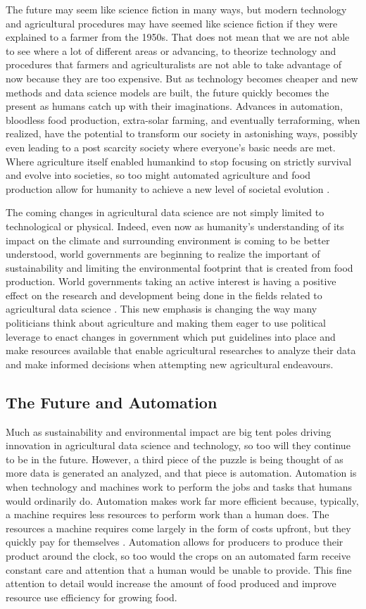 \documentclass[sigconf]{acmart}
\begin{document}
The future may seem like science fiction in many ways, but modern technology and agricultural procedures may have seemed like science fiction if they were explained to a farmer from the 1950s. That does not mean that we are not able to see where a lot of different areas or advancing, to theorize technology and procedures that farmers and agriculturalists are not able to take advantage of now because they are too expensive. But as technology becomes cheaper and new methods and data science models are built, the future quickly becomes the present as humans catch up with their imaginations. Advances in automation, bloodless food production, extra-solar farming, and eventually terraforming, when realized, have the potential to transform our society in astonishing ways, possibly even leading to a post scarcity society where everyone's basic needs are met. Where agriculture itself enabled humankind to stop focusing on strictly survival and evolve into societies, so too might automated agriculture and food production allow for humanity to achieve a new level of societal evolution \cite{david2017}.

The coming changes in agricultural data science are not simply limited to technological or physical. Indeed, even now as humanity's understanding of its impact on the climate and surrounding environment is coming to be better understood, world governments are beginning to realize the important of sustainability and limiting the environmental footprint that is created from food production. World governments taking an active interest is having a positive effect on the research and development being done in the fields related to agricultural data science \cite{capalbo2017}. This new emphasis is changing the way many politicians think about agriculture and making them eager to use political leverage to enact changes in government which put guidelines into place and make resources available that enable agricultural researches to analyze their data and make informed decisions when attempting new agricultural endeavours. 

\subsection{The Future and Automation}

Much as sustainability and environmental impact are big tent poles driving innovation in agricultural data science and technology, so too will they continue to be in the future. However, a third piece of the puzzle is being thought of as more data is generated an analyzed, and that piece is automation. Automation is when technology and machines work to perform the jobs and tasks that humans would ordinarily do. Automation makes work far more efficient because, typically, a machine requires less resources to perform work than a human does. The resources a machine requires come largely in the form of costs upfront, but they quickly pay for themselves \cite{kassler2001}. Automation allows for producers to produce their product around the clock, so too would the crops on an automated farm receive constant care and attention that a human would be unable to provide. This fine attention to detail would increase the amount of food produced and improve resource use efficiency for growing food.
\end{document}
